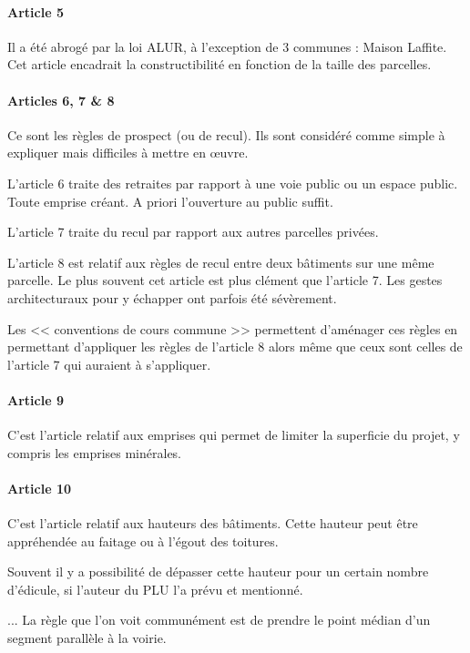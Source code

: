 			\paragraph{Article 5} Il a été abrogé par la loi ALUR, à l'exception de 3 communes : Maison Laffite. Cet article encadrait la constructibilité en fonction de la taille des parcelles. 
			
			\paragraph{Articles 6, 7 \& 8} Ce sont les règles de prospect (ou de recul). Ils sont considéré comme simple à expliquer mais difficiles à mettre en œuvre.
			
			L'article 6 traite des retraites par rapport à une voie public ou un espace public. Toute emprise créant. A priori l'ouverture au public suffit. 
			
			L'article 7 traite du recul par rapport aux autres parcelles privées.
			
			L'article 8 est relatif aux règles de recul entre deux bâtiments sur une même parcelle. Le plus souvent cet article est plus clément que l'article 7. Les gestes architecturaux pour y échapper ont parfois été sévèrement.
			
			Les << conventions de cours commune >> permettent d'aménager ces règles en permettant d'appliquer les règles de l'article 8 alors même que ceux sont celles de l'article 7 qui auraient à s'appliquer.
			
			\paragraph{Article 9} C'est l'article relatif aux emprises qui permet de limiter la superficie du projet, y compris les emprises minérales.
			
			\paragraph{Article 10} C'est l'article relatif aux hauteurs des bâtiments. Cette hauteur peut être appréhendée au faitage ou à l'égout des toitures.
			
			Souvent il y a possibilité de dépasser cette hauteur pour un certain nombre d'édicule, si l'auteur du PLU l'a prévu et mentionné.
			
			...
			La règle que l'on voit communément est de prendre le point médian d'un segment parallèle à la voirie.
			
